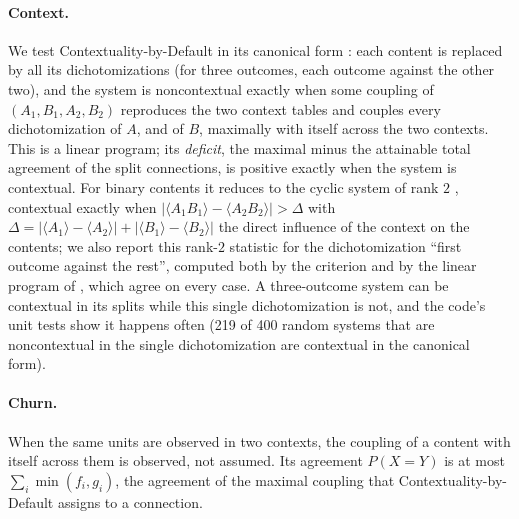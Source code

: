 \documentclass[11pt]{article}
\theoremstyle{definition}
\theoremstyle{remark}
\begin{document}
\paragraph{Context.} We test Contextuality-by-Default in its canonical form \cite{DzhafarovCervantesKujala2017}: each content is replaced
by all its dichotomizations (for three outcomes, each outcome against the other two), and the system is noncontextual exactly when some
coupling of $(A_1,B_1,A_2,B_2)$ reproduces the two context tables and couples every dichotomization of $A$, and of $B$, maximally with
itself across the two contexts. This is a linear program; its \emph{deficit}, the maximal minus the attainable total agreement of the split
connections, is positive exactly when the system is contextual. For binary contents it reduces to the cyclic system of rank $2$
\cite{DzhafarovKujala2016,KujalaDzhafarov2016}, contextual exactly when $\lvert\langle A_1B_1\rangle-\langle A_2B_2\rangle\rvert>\Delta$ with
$\Delta=\lvert\langle A_1\rangle-\langle A_2\rangle\rvert+\lvert\langle B_1\rangle-\langle B_2\rangle\rvert$ the direct influence of the context on
the contents; we also report this rank-$2$ statistic for the dichotomization ``first outcome against the rest'', computed both by the
criterion and by the linear program of \cite[\S4]{Bridges}, which agree on every case. A three-outcome system can be contextual in its
splits while this single dichotomization is not, and the code's unit tests show it happens often (219 of 400 random systems that are
noncontextual in the single dichotomization are contextual in the canonical form).

\paragraph{Churn.} When the same units are observed in two contexts, the coupling of a content with itself across them is observed, not
assumed. Its agreement $P(X=Y)$ is at most $\sum_i\min(f_i,g_i)$, the agreement of the maximal coupling that Contextuality-by-Default
assigns to a connection.
\end{document}
